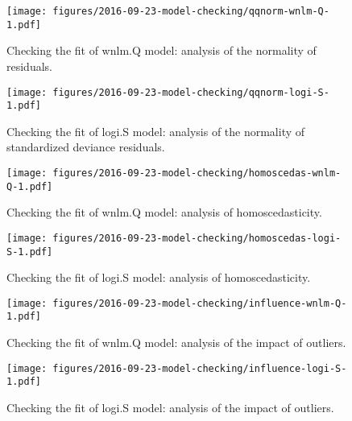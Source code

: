 \documentclass[12pt,letterpaper]{article}
\begin{document}
\begin{figure}[h]
\begin{center}
\texttt{[image: figures/2016-09-23-model-checking/qqnorm-wnlm-Q-1.pdf]}
\end{center}
\caption{
Checking the fit of wnlm.Q model: analysis of the normality of residuals.
}
\label{fig:qqnorm-wnlm.Q}
\end{figure}

\begin{figure}[h]
\begin{center}
\texttt{[image: figures/2016-09-23-model-checking/qqnorm-logi-S-1.pdf]}
\end{center}
\caption{
Checking the fit of logi.S model: analysis of the normality of standardized deviance residuals.
}
\label{fig:qqnorm-logi.S}
\end{figure}

\begin{figure}[h]
\begin{center}
\texttt{[image: figures/2016-09-23-model-checking/homoscedas-wnlm-Q-1.pdf]}
\end{center}
\caption{
Checking the fit of wnlm.Q model: analysis of homoscedasticity.
}
\label{fig:homoscedas-wnlm.Q}
\end{figure}

\begin{figure}[h]
\begin{center}
\texttt{[image: figures/2016-09-23-model-checking/homoscedas-logi-S-1.pdf]}
\end{center}
\caption{
Checking the fit of logi.S model: analysis of homoscedasticity.
}
\label{fig:homoscedas-logi.S}
\end{figure}

\begin{figure}[h]
\begin{center}
\texttt{[image: figures/2016-09-23-model-checking/influence-wnlm-Q-1.pdf]}
\end{center}
\caption{
Checking the fit of wnlm.Q model: analysis of the impact of outliers.
}
\label{fig:influence-wnlm.Q}
\end{figure}

\begin{figure}[h]
\begin{center}
\texttt{[image: figures/2016-09-23-model-checking/influence-logi-S-1.pdf]}
\end{center}
\caption{
Checking the fit of logi.S model: analysis of the impact of outliers.
}
\label{fig:influence-logi.S}
\end{figure}
\end{document}
